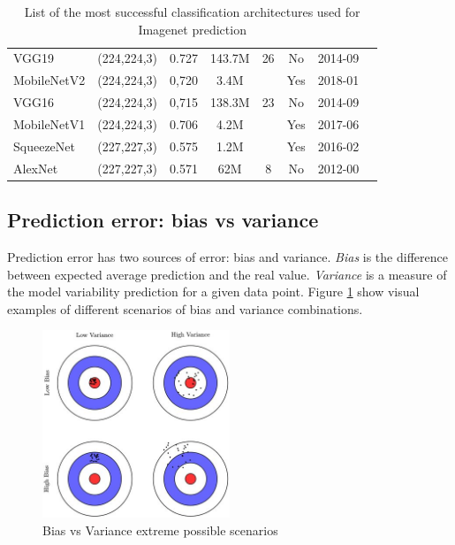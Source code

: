 \begin{table}[h!]
{\begin{tabular}{lccccccc}
		VGG19             & (224,224,3)         & 0.727                            & 143.7M              & 26             & No                & 2014-09              & \citep{vggnet}          \\
		MobileNetV2       & (224,224,3)         & 0,720                            & 3.4M                &                & Yes               & 2018-01              & \citep{sandler2018mobilenetv2}          \\
		VGG16             & (224,224,3)         & 0,715                            & 138.3M              & 23             & No                & 2014-09              & \citep{vggnet}          \\
		MobileNetV1       & (224,224,3)         & 0.706                            & 4.2M                &                & Yes               & 2017-06              & \citep{howard2017mobilenets}          \\
		SqueezeNet        & (227,227,3)         & 0.575                            & 1.2M                &                & Yes               & 2016-02              & \citep{iandola2016squeezenet}       \\
		AlexNet           & (227,227,3)         & 0.571                            & 62M                 & 8              & No                & 2012-00              & \citep{NIPS2012_4824}           
	\end{tabular}
}
\caption{List of the most successful classification architectures used for Imagenet prediction}
\label{back:fig:imagenet_models}
\end{table}


\subsection{Prediction error: bias vs variance}

Prediction error has two sources of error: bias and variance.
\emph{Bias} is the difference between expected average prediction and the real value. \emph{Variance} is a measure of the model variability prediction for a given data point. Figure \ref{back:fig:bias_variance} show visual examples of different scenarios of bias and variance combinations.

\begin{figure}[h!]
	\centering
	\includegraphics[width=0.50\textwidth]{Figures/chapter_background/bias_variance.png}
	\caption{Bias vs Variance extreme possible scenarios}
	\label{back:fig:bias_variance}
\end{figure}

